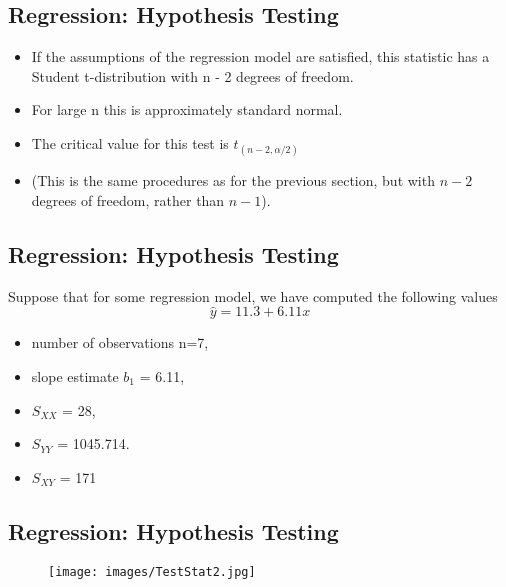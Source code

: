 \documentclass[]{report}
\begin{document}
	
	\subsection{Regression: Hypothesis Testing}
	\begin{itemize}
		\item If the assumptions of the regression model are satisfied, this
		statistic has a Student t-distribution with n - 2 degrees of freedom.
		\item For large n this is approximately standard normal.
		\item The critical value for this test is $t_{(n-2,\alpha/2)}$
		\item (This is the same procedures as for the previous section, but with $n-2$ degrees of freedom, rather than $n-1$).
	\end{itemize}
	
	
	\subsection{Regression: Hypothesis Testing}
	Suppose that for some regression model, we have computed the following values
	\[ \hat{y} = 11.3 + 6.11 x\]
	
	\begin{multicols}{2}
	\begin{itemize}
		\item number of observations n=7,
		\item slope estimate $b_1$ = 6.11,
		\item $S_{XX}$ = 28,
		\item $S_{YY}$ = 1045.714.
		\item $S_{XY}$ = 171
	\end{itemize}
	\end{multicols}
	
	
	\subsection{Regression: Hypothesis Testing}
	\begin{figure}[h!]
		\texttt{[image: images/TestStat2.jpg]}\\
	\end{figure}
	
\end{document}
